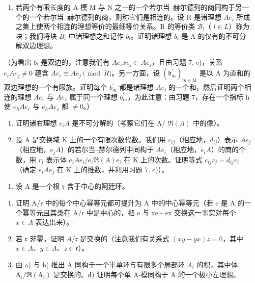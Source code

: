 \begin{enumerate}
\def\labelenumi{\alph{enumi})}
\tightlist
\item
  若两个有限长度的 A-模 M 与 N 之一的一个若尔当–赫尔德列的商同构于另一个的一个若尔当–赫尔德列的商，则称它们是相连的。设 R 是诸理想 \(Ae_{i}\) 所成之集上使两个相连的理想等价的最细等价关系。R 的等价类 \(\mathcal{B}_{l}\)（ \(l \in L\)）称为块；我们将块 \(B_{l}\) 中诸理想之和记作 \(b_{l}\)。证明诸理想 \(b_{l}\) 是 A 的仅有的不可分解双边理想。
\end{enumerate}

（为看出 \(b_{l}\) 是双边的，注意我们有 \(Ae_{i}xe_{j} \subset Ae_{j}\)，且由习题 7, c)，关系 \(e_{i}Ae_{j} \neq 0\) 蕴含 \(Ae_{i} \equiv Ae_{j} \pmod{R}\)。另一方面，设 \((\mathfrak{b}_{m}^{\prime})_{m \in \mathrm{M}}\) 是以 A 为直和的双边理想的一个有限族。证明每个 \(b_{m}^{\prime}\) 都是诸理想 \(Ae_{i}\) 的一个和，然后证明两个相连的理想 \(Ae_{r}\) 与 \(Ae_{s}\) 属于同一个理想 \(b_{m}^{\prime}\)，为此注意：由习题 7，存在一个指标 h 使 \(e_{h}Ae_{r}\) 与 \(e_{h}Ae_{s}\) 都 \(\neq 0\)。）

\begin{enumerate}
\def\labelenumi{\alph{enumi})}
\setcounter{enumi}{1}
\item
  证明诸右理想 \(e_{i}A\) 是不可分解的（考察它们在 A/ \(\Re(A)\) 中的像）。
\item
  设 A 是交换域 K 上的一个有限次数代数。我们用 \(c_{ij}\)（相应地，\(d_{ij}\)）表示 \(Ae_{j}\)（相应地，\(e_{j}A\)）的若尔当–赫尔德列中同构于 \(\overline{A}\overline{e}_{i}\)（相应地，\(\overline{e}_{i}\overline{A}\)）的商的个数，用 \(r_{i}\) 表示体 \(e_{i}Ae_{i}/e_{i}\Re(A)e_{i}\) 在 K 上的次数。证明等式 \(c_{ij}r_{j}=d_{ij}r_{i}\)（确定 \(e_{i}Ae_{j}\) 在 K 上的维数，并利用习题 7, c)）。
\end{enumerate}

\begin{enumerate}
\def\labelenumi{\arabic{enumi})}
\setcounter{enumi}{8}
\tightlist
\item
  设 A 是一个根 \(\mathfrak{r}\) 含于中心的阿廷环。
\end{enumerate}

\begin{enumerate}
\def\labelenumi{\alph{enumi})}
\item
  证明 A/r 中的每个中心幂等元都可提升为 A 中的中心幂等元（若 e 是 A 的一个幂等元且其类在 A/r 中是中心的，把 e 与 xe - ex 交换这一事实对每个 \(x \in A\) 表达出来）。
\item
  若 \(\mathfrak{r}\) 非零，证明 \(A / \mathfrak{r}\) 是交换的（注意我们有关系式 \((xy - yx)z = 0\)，其中 \(x\in A\)、\(y\in A\)、\(z\in \mathfrak{r}\)）。
\item
  由 a) 与 b) 推出 A 同构于一个半单环与有限多个局部环 \(A_{i}\) 的积，其中体 \(\mathrm{A}_{i}/\Re(\mathrm{A}_{i})\) 是交换的。d) 证明每个单 A-模同构于 A 的一个极小左理想。
\end{enumerate}


